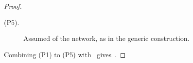 \begin{proof}
\begin{description}
  \item[(P5).] Assumed of the network, as in the generic construction.

\end{description}

Combining (P1) to (P5) with~ gives~.

\end{proof}
